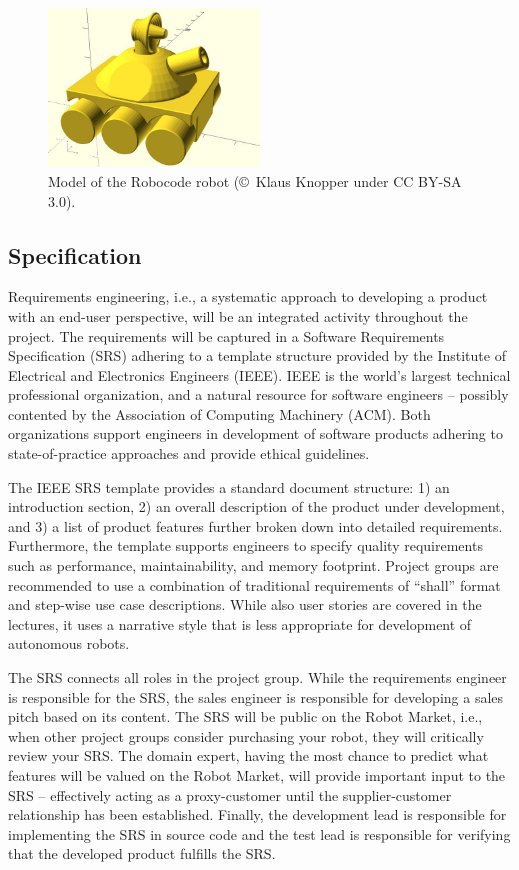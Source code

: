 \documentclass{scrreprt}
\begin{document}
\begin{figure}
\centering
\includegraphics[width=0.50\textwidth]{figures/robotSide.jpg}
\caption{Model of the Robocode robot (\copyright~Klaus Knopper under CC BY-SA 3.0).}
\label{fig:robot}
\end{figure}

\subsection{Specification}
Requirements engineering, i.e., a systematic approach to developing a product with an end-user perspective, will be an integrated activity throughout the project. The requirements will be captured in a Software Requirements Specification (SRS) adhering to a template structure provided by the Institute of Electrical and Electronics Engineers (IEEE). IEEE is the world's largest technical professional organization, and a natural resource for software engineers -- possibly contented by the Association of Computing Machinery (ACM). Both organizations support engineers in development of software products adhering to state-of-practice approaches and provide ethical guidelines.

The IEEE SRS template provides a standard document structure: 1) an introduction section, 2) an overall description of the product under development, and 3) a list of product features further broken down into detailed requirements. Furthermore, the template supports engineers to specify quality requirements such as performance, maintainability, and memory footprint. Project groups are recommended to use a combination of traditional requirements of ``shall'' format and step-wise use case descriptions. While also user stories are covered in the lectures, it uses a narrative style that is less appropriate for development of autonomous robots.

The SRS connects all roles in the project group. While the requirements engineer is responsible for the SRS, the sales engineer is responsible for developing a sales pitch based on its content. The SRS will be public on the Robot Market, i.e., when other project groups consider purchasing your robot, they will critically review your SRS. The domain expert, having the most chance to predict what features will be valued on the Robot Market, will provide important input to the SRS -- effectively acting as a proxy-customer until the supplier-customer relationship has been established. Finally, the development lead is responsible for implementing the SRS in source code and the test lead is responsible for verifying that the developed product fulfills the SRS.
\end{document}
